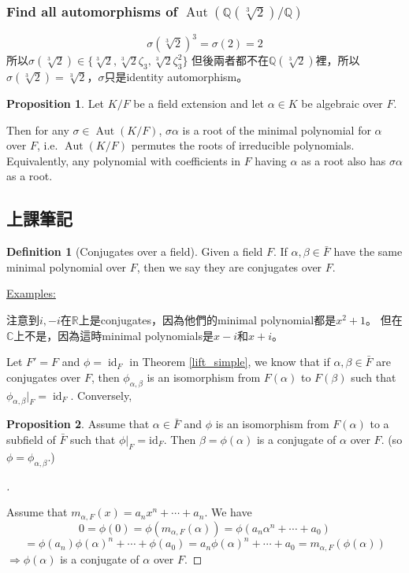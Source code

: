 \documentclass[12pt]{article}
\theoremstyle{definition}
\newcommand{\ex}{\noindent\underline{Examples:}}
\newtheorem{dfn}{Definition}
\newtheorem{prop}{Proposition}
\newenvironment{proofs}[1][\proofname]{%
  \begin{proof}[#1]$ $\par\nobreak\ignorespaces
}{%
  \end{proof}
}
\newcommand{\CC}{\mathbb C}
\newcommand{\QQ}{\mathbb Q}
\newcommand{\RR}{\mathbb R}
\DeclareMathOperator{\Aut}{Aut}
\DeclareMathOperator{\id}{id}
\begin{document}
\subsubsection*{Find all automorphisms of $\Aut(\QQ(\sqrt[3]{2})/\QQ)$}
\[\sigma(\sqrt[3]{2})^3=\sigma(2)=2\]
所以$\sigma(\sqrt[3]{2})\in \{\sqrt[3]{2},\sqrt[3]{2}\zeta_3, \sqrt[3]{2}\zeta_3^2\}$
但後兩者都不在$\QQ(\sqrt[3]{2})$裡，所以$\sigma(\sqrt[3]{2})=\sqrt[3]{2}$，$\sigma$只是identity automorphism。

\begin{prop}
	Let $K/F$ be a field extension and let $\alpha\in K$ be algebraic over $F$.

	Then for any $\sigma\in\Aut(K/F)$, $\sigma\alpha$ is a root of the minimal polynomial for $\alpha$ over $F$,
	i.e. $\Aut(K/F)$ permutes the roots of irreducible polynomials. Equivalently, any polynomial with coefficients in $F$ having $\alpha$ as a root also has $\sigma\alpha$ as a root.
\end{prop}

\subsection{上課筆記}

\begin{dfn}[Conjugates over a field]
	Given a field $F$.
	If $\alpha,\beta\in\bar{F}$
	have the same minimal polynomial over $F$, then
	we say they are conjugates over $F$.
\end{dfn}

\ex

注意到$i,-i$在$\RR$上是conjugates，因為他們的minimal polynomial都是$x^2+1$。
但在$\CC$上不是，因為這時minimal polynomials是$x-i$和$x+i$。


Let $F'=F$ and $\phi=\id_F$ in Theorem \ref{lift_simple}, we know that if $\alpha,\beta\in \bar{F}$ are conjugates over $F$, then $\phi_{\alpha,\beta}$ is an isomorphism from $F(\alpha)$ to $F(\beta)$ such that $\phi_{\alpha,\beta}|_F=\id_F$.
Conversely,

\begin{prop}
	Assume that $\alpha \in \bar{F}$ and $\phi$ is an isomorphism from $F(\alpha)$ to a subfield of $\bar{F}$ such that $\phi|_F = \text{id}_F$.
	Then $\beta=\phi(\alpha)$ is a conjugate of $\alpha$ over $F$. (so $\phi = \phi_{\alpha, \beta}$.)
\end{prop}

\begin{proofs}
	Assume that $m_{\alpha, F}(x) = a_n x^n + \cdots + a_n$.
	We have
	\[
		0 = \phi(0) = \phi(m_{\alpha, F}(\alpha)) = \phi(a_n \alpha^n + \cdots + a_0)
	\]
	\[
		= \phi(a_n) \phi(\alpha)^n + \cdots + \phi(a_0) = a_n \phi(\alpha)^n + \cdots + a_0 = m_{\alpha, F}(\phi(\alpha))
	\]
	$\Rightarrow \phi(\alpha)$ is a conjugate of $\alpha$ over $F$.

\end{proofs}
\end{document}
